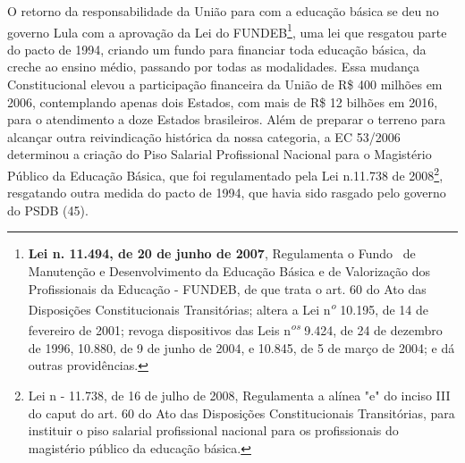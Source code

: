 O retorno da responsabilidade da União para com a educação básica se deu
no governo Lula com a aprovação da Lei do FUNDEB\footnote{\textbf{Lei n.
  11.494, de 20 de junho de 2007}, Regulamenta o Fundo~ de Manutenção e
  Desenvolvimento da Educação Básica e de Valorização dos Profissionais
  da Educação - FUNDEB, de que trata o art. 60 do Ato das Disposições
  Constitucionais Transitórias; altera a Lei n\textsuperscript{\emph{o}}
  10.195, de 14 de fevereiro de 2001; revoga dispositivos das Leis
  n\textsuperscript{\emph{os}} 9.424, de 24 de dezembro de 1996, 10.880,
  de 9 de junho de 2004, e 10.845, de 5 de março de 2004; e dá outras
  providências.}, uma lei que resgatou parte do pacto de 1994, criando
um fundo para financiar toda educação básica, da creche ao ensino médio,
passando por todas as modalidades. Essa mudança Constitucional elevou a
participação financeira da União de R\$ 400 milhões em 2006,
contemplando apenas dois Estados, com mais de R\$ 12 bilhões em 2016,
para o atendimento a doze Estados brasileiros. Além de preparar o
terreno para alcançar outra reivindicação histórica da nossa categoria,
a EC 53/2006 determinou a criação do Piso Salarial Profissional Nacional
para o Magistério Público da Educação Básica, que foi regulamentado pela
Lei n.11.738 de 2008\footnote{Lei n - 11.738, de 16 de
  julho de 2008, Regulamenta a alínea "e" do inciso III do caput do art.
  60 do Ato das Disposições Constitucionais Transitórias, para instituir
  o piso salarial profissional nacional para os profissionais do
  magistério público da educação
  básica.},
resgatando outra medida do pacto de 1994, que havia sido rasgado pelo
governo do PSDB (45).

